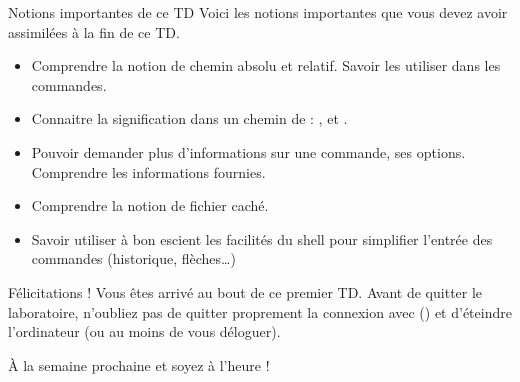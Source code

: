 \documentclass[a4paper,11pt]{style-esi/td}
\begin{document}
	\begin{theorie}{Notions importantes de ce TD}
		Voici les notions importantes que vous devez avoir assimilées à la fin de ce TD.
		\begin{itemize}
		\item 
			Comprendre la notion de chemin absolu et relatif.
			Savoir les utiliser dans les commandes.
		\item 
			Connaitre la signification dans un chemin de : 
			\og{}\samp{\textasciitilde}\fg{},
			\og{}\fg{} et \og{}\fg{}.
		\item 
			Pouvoir demander plus d'informations sur une commande, ses options.
			Comprendre les informations fournies.
		\item 
			Comprendre la notion de fichier caché.
		\item 
			Savoir utiliser à bon escient les facilités du shell
			pour simplifier l'entrée des commandes (historique, flèches\dots)
		\end{itemize}
	\end{theorie}

	\bigskip
	\begin{infotbox}{Félicitations !} 
		Vous êtes arrivé au bout de ce premier TD.
		Avant de quitter le laboratoire, n'oubliez pas de quitter proprement 
		la connexion avec  () 
		et d'éteindre l'ordinateur (ou au moins de vous déloguer).

		À la semaine prochaine et soyez à l'heure !
	\end{infotbox}
\end{document}
